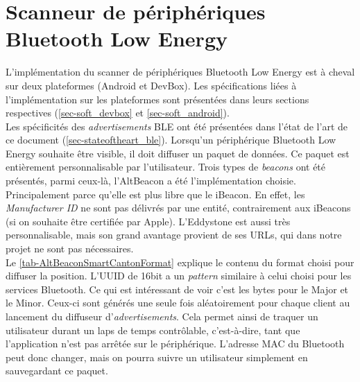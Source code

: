 \section{Scanneur de périphériques Bluetooth Low Energy}
\label{sec-software_scanner_ble}

L'implémentation du scanner de périphériques Bluetooth Low Energy est à cheval sur deux plateformes (Android et DevBox). Les spécifications liées à l'implémentation sur les plateformes sont présentées dans leurs sections respectives (\cref{sec-soft_devbox} et \cref{sec-soft_android}). \\


Les spécificités des \textit{advertisements} BLE ont été présentées dans l'état de l'art de ce document (\cref{sec-stateoftheart_ble}). Lorsqu'un périphérique Bluetooth Low Energy souhaite être visible, il doit diffuser un paquet de données. Ce paquet est entièrement personnalisable par l'utilisateur. Trois types de \textit{beacons} ont été présentés, parmi ceux-là, l'AltBeacon a été l'implémentation choisie. Principalement parce qu'elle est plus libre que le iBeacon. En effet, les \textit{Manufacturer ID} ne sont pas délivrés par une entité, contrairement aux iBeacons (si on souhaite être certifiée
par Apple). L'Eddystone est aussi très personnalisable, mais son grand avantage provient de ses URLs, qui dans notre projet ne sont pas nécessaires.  \\

Le \cref{tab-AltBeaconSmartCantonFormat} explique le contenu du format choisi pour diffuser la position. L'UUID de 16bit a un \textit{pattern} similaire à celui choisi pour les services Bluetooth. Ce qui est intéressant de voir c'est les bytes pour le Major et le Minor. Ceux-ci sont générés une seule fois aléatoirement pour chaque client au lancement du diffuseur d'\textit{advertisements}. Cela permet ainsi de traquer un utilisateur durant un laps de temps contrôlable, c'est-à-dire, tant que l'application n'est pas arrêtée sur le périphérique. L'adresse MAC du Bluetooth peut donc changer, mais on pourra suivre un utilisateur simplement en sauvegardant ce paquet.


